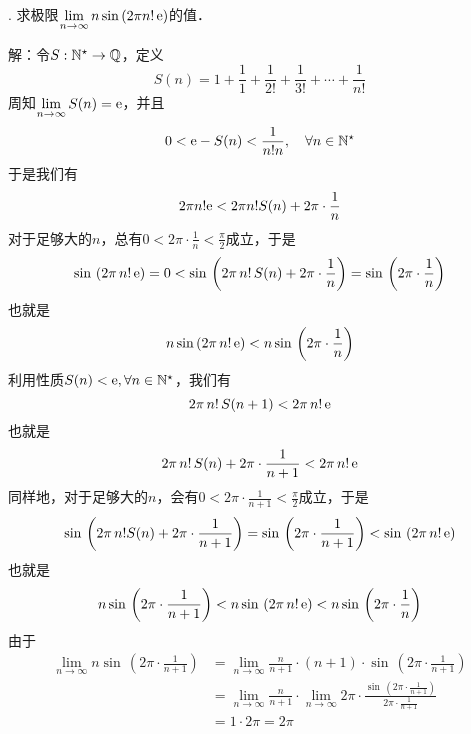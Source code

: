 . 求极限$\displaystyle\lim_{n \to \infty} n \sin \, (2 \pi n! \, \mathrm{e})$的值．

\noindent 解：令$S: \mathbb{N}^\star \to \mathbb{Q}$，定义
\begin{equation}
    S(n) = 1 + \frac{1}{1} + \frac{1}{2!} + \frac{1}{3!} + \cdots + \frac{1}{n!}
\end{equation}
周知$\displaystyle\lim_{n \to \infty} S(n) = \mathrm{e}$，并且
\begin{equation}
0 < \mathrm{e} - S(n) < \frac{1}{n! n}, \quad \forall n \in \mathbb{N}^\star
\end{equation}
于是我们有
\begin{equation}
2 \pi n! \mathrm{e} < 2 \pi n! S(n) + 2\pi \cdot \frac{1}{n}
\end{equation}
对于足够大的$n$，总有$0 < 2 \pi \cdot\displaystyle\frac{1}{n} < \displaystyle\frac{\pi}{2}$成立，于是
\begin{equation}
    \sin \, \left(2 \pi \, n! \, \mathrm{e} \right) = 0 < \sin \, \left(2 \pi \, n! \, S(n) + 2 \pi \cdot \displaystyle\frac{1}{n} \right) = \sin \, \left(2 \pi \cdot \displaystyle\frac{1}{n} \right)
\end{equation}
也就是
\begin{equation}
    n \sin \left(2 \pi \, n! \, \mathrm{e} \right) < n \sin \, \left(2 \pi \cdot \displaystyle\frac{1}{n} \right)
\end{equation}
利用性质$S(n) < \mathrm{e}, \forall n \in \mathbb{N}^\star$，我们有
\begin{equation}
    2 \pi \, n! \, S(n+1) < 2 \pi \, n! \, \mathrm{e}
\end{equation}
也就是
\begin{equation}
    2\pi \, n! \, S(n) + 2 \pi \cdot \displaystyle\frac{1}{n+1} < 2 \pi \, n! \, \mathrm{e}
\end{equation}
同样地，对于足够大的$n$，会有$0 < 2\pi \cdot \displaystyle\frac{1}{n+1} < \displaystyle\frac{\pi}{2}$成立，于是
\begin{equation}
    \sin \, \left(2 \pi \, n! S(n) + 2 \pi \cdot \displaystyle\frac{1}{n+1} \right) = \sin \, \left(2 \pi \cdot \displaystyle\frac{1}{n+1}\right) < \sin \, \left(2 \pi \, n! \, \mathrm{e} \right)
\end{equation}
也就是
\begin{equation}
    n \sin \, \left(2 \pi \cdot \displaystyle\frac{1}{n+1} \right) < n \sin \, \left(2 \pi \, n! \, \mathrm{e} \right) < n \sin \, \left(2 \pi \cdot \displaystyle\frac{1}{n}\right)
\end{equation}
由于
\begin{align}
    \lim_{n \to \infty} n \sin \, \left(2 \pi \cdot \displaystyle\frac{1}{n+1} \right) &= \lim_{n \to \infty} \displaystyle\frac{n}{n+1} \cdot (n+1) \cdot \sin \, \left(2 \pi \cdot \displaystyle\frac{1}{n+1}\right) \\
    &= \lim_{n \to \infty} \displaystyle\frac{n}{n+1} \cdot \lim_{n \to \infty} 2 \pi \cdot \displaystyle\frac{\sin \, \left(2 \pi \cdot \displaystyle\frac{1}{n+1}\right)}{2 \pi \cdot \displaystyle\frac{1}{n+1}} \\
    &= 1 \cdot 2 \pi = 2 \pi
\end{align}
